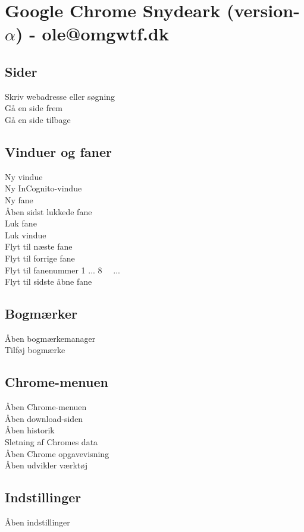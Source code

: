 \documentclass[a4paper, landscape, 11pt]{scrartcl}
\newcommand{\command}[2]{#1~\dotfill{}~#2\\} %
\begin{document}
\section*{Google Chrome Snydeark (version-$\alpha$) - ole@omgwtf.dk}

\hrulefill{}

\begin{multicols}{2}

\subsection*{Sider}
\command{Skriv webadresse eller søgning}{}
\command{Gå en side frem}{\keys{\Alt + \arrowkeyleft}}
\command{Gå en side tilbage}{\keys{\Alt + \arrowkeyright}}

\subsection*{Vinduer og faner}
\command{Ny vindue}{ }
\command{Ny InCognito-vindue}{ }
\command{Ny fane}{ }
\command{Åben sidst lukkede fane}{ }
\command{Luk fane}{ }
\command{Luk vindue}{ }
\command{Flyt til næste fane}{\keys{\ctrl + \tab}}
\command{Flyt til forrige fane}{\keys{\ctrl + \shift + \tab}}
\command{Flyt til fanenummer 1 ... 8}{ ... \keys{8}}
\command{Flyt til sidste åbne fane}{}

\subsection*{Bogmærker}
\command{Åben bogmærkemanager}{}
\command{Tilføj bogmærke}{}

\subsection*{Chrome-menuen}
\command{Åben Chrome-menuen}{}
\command{Åben download-siden}{}
\command{Åben historik}{}
\command{Sletning af Chromes data}{\keys{\ctrl + \shift + \del}}
\command{Åben Chrome opgavevisning}{\keys{\shift + \esc}}
\command{Åben udvikler værktøj}{}

\subsection*{Indstillinger}
\command{Åben indstillinger}{ }

\end{multicols}

\hrulefill{}
\end{document}
